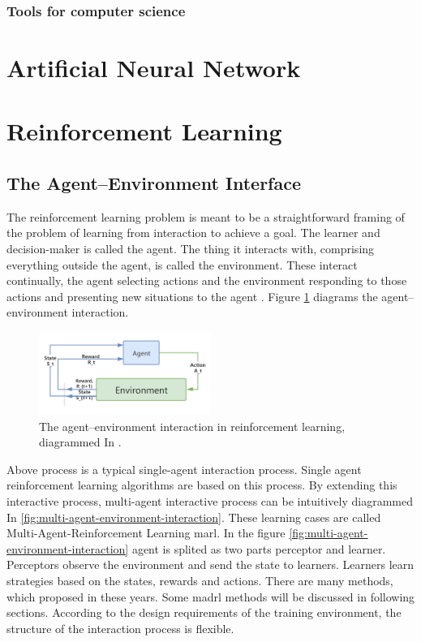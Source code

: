 \subsubsection{Tools for computer science}

\section{Artificial Neural Network}

\section{Reinforcement Learning}
\subsection{The Agent–Environment Interface}
The reinforcement learning problem is meant to be a straightforward framing
of the problem of learning from interaction to achieve a goal. The learner and
decision-maker is called the agent. The thing it interacts with, comprising
everything outside the agent, is called the environment. These interact continually, the agent selecting actions and the environment responding to those
actions and presenting new situations to the agent \parencite{Sutton2018}. 
Figure \ref{fig:agent-environment-interaction} diagrams the agent–environment interaction.

\begin{figure}[htbp]
\centering
\includegraphics[width=0.5\textwidth]{./images/agent-environment-interaction.png}
\caption{The agent–environment interaction in reinforcement learning, diagrammed In \parencite{Sutton2018}.}
\label{fig:agent-environment-interaction}
\end{figure}

Above process is a typical single-agent interaction process. Single agent reinforcement learning algorithms are based on this process. By extending this interactive process, multi-agent interactive process can be intuitively diagrammed In \ref{fig:multi-agent-environment-interaction}. These learning cases are called Multi-Agent-Reinforcement Learning \gls{marl}. In the figure \ref{fig:multi-agent-environment-interaction} agent is splited as two parts perceptor and learner. Perceptors observe the environment and send the state to learners. Learners learn strategies based on the states, rewards and actions. There are many methods, which proposed in these years. Some \gls{madrl} methods will be discussed in following sections. According to the design requirements of the training environment, the structure of the interaction process is flexible.

